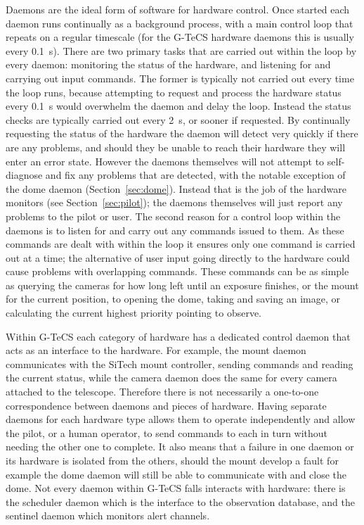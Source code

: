 \begin{colsection}
\begin{colsection}
Daemons are the ideal form of software for hardware control. Once started each daemon runs continually as a background process, with a main control loop that repeats on a regular timescale (for the G-TeCS hardware daemons this is usually every \SI{0.1}{\second}). There are two primary tasks that are carried out within the loop by every daemon: monitoring the status of the hardware, and listening for and carrying out input commands. The former is typically not carried out every time the loop runs, because attempting to request and process the hardware status every \SI{0.1}{\second} would overwhelm the daemon and delay the loop. Instead the status checks are typically carried out every \SI{2}{\second}, or sooner if requested. By continually requesting the status of the hardware the daemon will detect very quickly if there are any problems, and should they be unable to reach their hardware they will enter an error state. However the daemons themselves will not attempt to self-diagnose and fix any problems that are detected, with the notable exception of the dome daemon (Section~\ref{sec:dome}). Instead that is the job of the hardware monitors (see Section~\ref{sec:pilot}); the daemons themselves will just report any problems to the pilot or user. The second reason for a control loop within the daemons is to listen for and carry out any commands issued to them. As these commands are dealt with within the loop it ensures only one command is carried out at a time; the alternative of user input going directly to the hardware could cause problems with overlapping commands. These commands can be as simple as querying the cameras for how long left until an exposure finishes, or the mount for the current position, to opening the dome, taking and saving an image, or calculating the current highest priority pointing to observe.

Within G-TeCS each category of hardware has a dedicated control daemon that acts as an interface to the hardware. For example, the mount daemon communicates with the SiTech mount controller, sending commands and reading the current status, while the camera daemon does the same for every camera attached to the telescope. Therefore there is not necessarily a one-to-one correspondence between daemons and pieces of hardware. Having separate daemons for each hardware type allows them to operate independently and allow the pilot, or a human operator, to send commands to each in turn without needing the other one to complete. It also means that a failure in one daemon or its hardware is isolated from the others, should the mount develop a fault for example the dome daemon will still be able to communicate with and close the dome. Not every daemon within G-TeCS falls interacts with hardware: there is the scheduler daemon which is the interface to the observation database, and the sentinel daemon which monitors alert channels.


\end{colsection}
\end{colsection}
